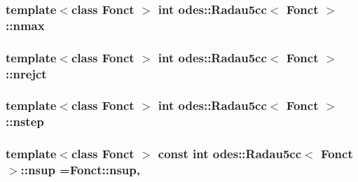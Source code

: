 \subsubsection[{nmax}]{\setlength{\rightskip}{0pt plus 5cm}template$<$class Fonct $>$ int {\bf odes\+::\+Radau5cc}$<$ Fonct $>$\+::nmax\hspace{0.3cm}{\ttfamily [private]}}\label{classodes_1_1Radau5cc_a42980e5cf06bc0f4c1a0ef1a1922615f}
\hypertarget{classodes_1_1Radau5cc_a04e6193a9f5be15a7e969b2ad4e5f344}{}
\subsubsection[{nrejct}]{\setlength{\rightskip}{0pt plus 5cm}template$<$class Fonct $>$ int {\bf odes\+::\+Radau5cc}$<$ Fonct $>$\+::nrejct\hspace{0.3cm}{\ttfamily [private]}}\label{classodes_1_1Radau5cc_a04e6193a9f5be15a7e969b2ad4e5f344}
\hypertarget{classodes_1_1Radau5cc_af1a16f749cd5fd53c66af9a913a37d0a}{}
\subsubsection[{nstep}]{\setlength{\rightskip}{0pt plus 5cm}template$<$class Fonct $>$ int {\bf odes\+::\+Radau5cc}$<$ Fonct $>$\+::nstep\hspace{0.3cm}{\ttfamily [private]}}\label{classodes_1_1Radau5cc_af1a16f749cd5fd53c66af9a913a37d0a}
\hypertarget{classodes_1_1Radau5cc_a4e80b8064e4d8f60262591531fcd1ff0}{}
\subsubsection[{nsup}]{\setlength{\rightskip}{0pt plus 5cm}template$<$class Fonct $>$ const int {\bf odes\+::\+Radau5cc}$<$ Fonct $>$\+::nsup =Fonct\+::nsup\hspace{0.3cm}{\ttfamily [static]}, {\ttfamily [private]}}\label{classodes_1_1Radau5cc_a4e80b8064e4d8f60262591531fcd1ff0}
\hypertarget{classodes_1_1Radau5cc_a99fc26950c9004ac83c8b16f8cc41070}{}
